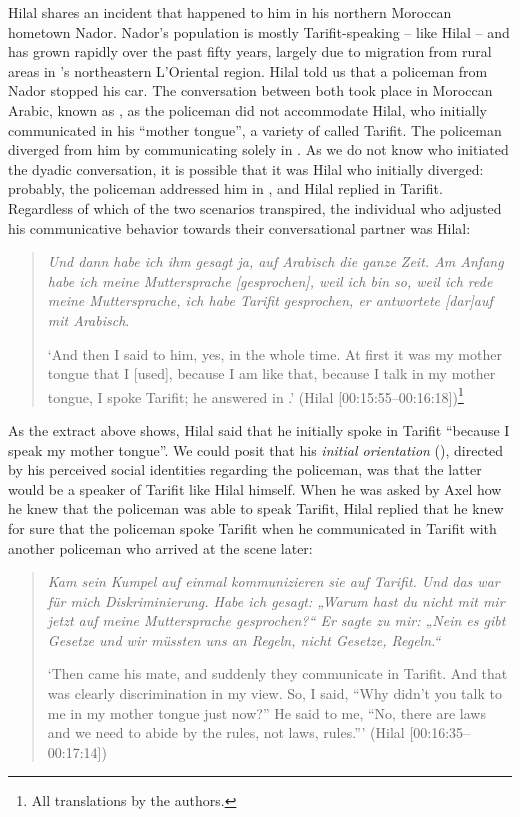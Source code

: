 \documentclass[output=paper,colorlinks,citecolor=brown]{langscibook}
\begin{document}
Hilal shares an incident that happened to him in his northern Moroccan hometown Nador. Nador's population is mostly Tarifit-speaking -- like Hilal -- and has grown rapidly over the past fifty years, largely due to migration from rural areas in 's northeastern L'Oriental region. Hilal told us that a policeman from Nador stopped his car. The conversation between both took place in Moroccan Arabic, known as , as the policeman did not accommodate Hilal, who initially communicated in his ``mother tongue'', a variety of  called Tarifit. The policeman diverged from him by communicating solely in . As we do not know who initiated the dyadic conversation, it is possible that it was Hilal who initially diverged: probably, the policeman addressed him in , and Hilal replied in Tarifit. Regardless of which of the two scenarios transpired, the individual who adjusted his communicative behavior towards their conversational partner was Hilal: 
\begin{quote}
\textit{Und dann habe ich ihm gesagt ja, auf Arabisch die ganze Zeit. Am Anfang habe ich meine Muttersprache \textnormal{[}gesprochen\textnormal{]}, weil ich bin so, weil ich rede meine Muttersprache, ich habe Tarifit gesprochen, er antwortete \textnormal{[}dar\textnormal{]}auf mit Arabisch}. 

`And then I said to him, yes, in  the whole time. At first it was my mother tongue that I [used], because I am like that, because I talk in my mother tongue, I spoke Tarifit; he answered in .' (Hilal [00:15:55--00:16:18])\footnote{All translations by the authors.}
\end{quote}

As the extract above shows, Hilal said that he initially spoke in Tarifit ``because I speak my mother tongue''. We could posit that his \textit{initial orientation} (\citealt{dragojevic_gasiorek_giles2016}), directed by his perceived social identities regarding the policeman, was that the latter would be a speaker of Tarifit like Hilal himself. When he was asked by Axel how he knew that the policeman was able to speak Tarifit, Hilal replied that he knew for sure that the policeman spoke Tarifit when he communicated in Tarifit with another policeman who arrived at the scene later: 
\begin{quote}
\textit{Kam sein Kumpel auf einmal kommunizieren sie auf Tarifit. Und das war für mich Diskriminierung. Habe ich gesagt: „Warum hast du nicht mit mir jetzt auf meine Muttersprache gesprochen?{“} Er sagte zu mir: „Nein es gibt Gesetze und wir müssten uns an Regeln, nicht Gesetze, Regeln.“}

`Then came his mate, and suddenly they communicate in Tarifit. And that was clearly discrimination in my view. So, I said, ``Why didn't you talk to me in my mother tongue just now?'' He said to me, ``No, there are laws and we need to abide by the rules, not laws, rules.{''}' (Hilal [00:16:35--00:17:14])
\end{quote}
\end{document}
